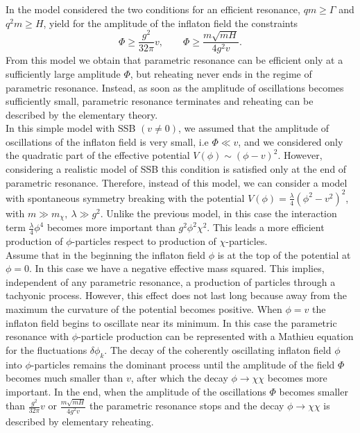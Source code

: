 \documentclass[11pt,a4paper,twoside]{book}
\begin{document}
In the model considered the two conditions for an efficient resonance, $ qm \ge \Gamma $ and $ q^{2}m \ge H $, yield for the amplitude of the inflaton field the constraints
\begin{equation}
\label{Chap4:conditionAmplitudeField}
\Phi \ge \frac{g^{2}}{32\pi}v, \qquad  \Phi \ge \frac{m\sqrt{mH}}{4g^{2}v}.
\end{equation}
From this model we obtain that parametric resonance can be efficient only at a sufficiently large  amplitude $\Phi$, but reheating never ends in the regime of parametric resonance. Instead, as soon as the amplitude of oscillations becomes sufficiently  small, parametric resonance terminates and reheating can be described by the elementary theory.\\
In this simple model with SSB $ (v \neq 0) $, we assumed that the amplitude of oscillations of the inflaton field is very small, i.e $ \Phi \ll v $, and we considered only the quadratic part of the effective potential $ V(\phi) \sim (\phi - v)^{2} $. However, considering a realistic model of SSB this condition is satisfied only at the end of parametric resonance. Therefore, instead of this model, we can consider a model with spontaneous symmetry breaking with the potential $ V(\phi)=\frac{\lambda}{4}(\phi^{2}-v^{2})^{2} $, with $ m \gg m_{\chi},\ \lambda \gg g^{2} $. Unlike the previous model, in this case the interaction term $\frac{\lambda}{4}\phi^{4}  $ becomes more important than $ g^{2}\phi^{2}\chi^{2} $. This leads a more efficient production of $ \phi $-particles respect to production of $ \chi $-particles.\\
Assume that in the beginning the inflaton field $ \phi $ is at the top of the potential at $ \phi=0 $. In this case we have a negative effective mass squared. This implies, independent of any parametric resonance, a production of particles through a tachyonic process. However, this effect does not last long because away from the maximum the curvature of the potential becomes positive. When $ \phi = v $ the inflaton field begins to oscillate near its minimum. In this case the parametric resonance  with $ \phi $-particle production can be represented with a Mathieu equation  for the fluctuations $\delta \phi_{k}$. 
The decay of the coherently oscillating inflaton field $\phi$ into $\phi$-particles remains the dominant process until the amplitude of the field $\Phi$ becomes much smaller than $ v $, after which the decay $ \phi \rightarrow \chi \chi $ becomes more important. In the end, when the amplitude of the oscillations $ \Phi $ becomes smaller than $ \frac{g^{2}}{32\pi}v $  or   $ \frac{m\sqrt{mH}}{4g^{2}v} $ the parametric resonance stops and the decay $ \phi \rightarrow \chi \chi $ is described by elementary reheating.
\end{document}
